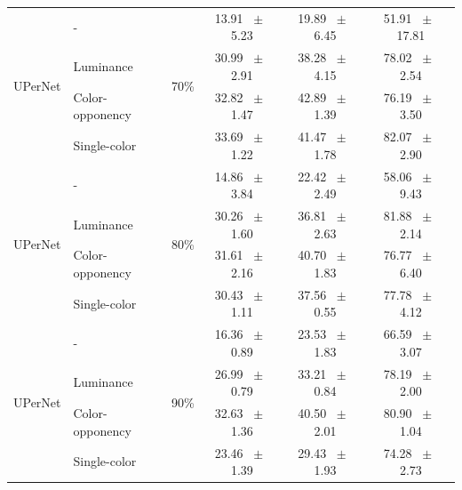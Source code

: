 \begin{table}[h]
\begin{tabular}{@{}l l c c c c@{}}
    \multirow{4}{*}{UPerNet} & - & \multirow{4}{*}{70\%} & 13.91 ~$\pm$~ 5.23 & 19.89 ~$\pm$~ 6.45 & 51.91 ~$\pm$~ 17.81 \\
    & Luminance &  & 30.99 ~$\pm$~ 2.91 & 38.28 ~$\pm$~ 4.15 & 78.02 ~$\pm$~ 2.54 \\
    & Color-opponency &  & 32.82 ~$\pm$~ 1.47 & 42.89 ~$\pm$~ 1.39 & 76.19 ~$\pm$~ 3.50 \\
    & Single-color &  & 33.69 ~$\pm$~ 1.22 & 41.47 ~$\pm$~ 1.78 & 82.07 ~$\pm$~ 2.90 \\
    \midrule
    \multirow{4}{*}{UPerNet} & - & \multirow{4}{*}{80\%} & 14.86 ~$\pm$~ 3.84 & 22.42 ~$\pm$~ 2.49 & 58.06 ~$\pm$~ 9.43 \\
    & Luminance &  & 30.26 ~$\pm$~ 1.60 & 36.81 ~$\pm$~ 2.63 & 81.88 ~$\pm$~ 2.14 \\
    & Color-opponency &  & 31.61 ~$\pm$~ 2.16 & 40.70 ~$\pm$~ 1.83 & 76.77 ~$\pm$~ 6.40 \\
    & Single-color &  & 30.43 ~$\pm$~ 1.11 & 37.56 ~$\pm$~ 0.55 & 77.78 ~$\pm$~ 4.12 \\
    \midrule
    \multirow{4}{*}{UPerNet} & - & \multirow{4}{*}{90\%} & 16.36 ~$\pm$~ 0.89 & 23.53 ~$\pm$~ 1.83 & 66.59 ~$\pm$~ 3.07 \\
    & Luminance &  & 26.99 ~$\pm$~ 0.79 & 33.21 ~$\pm$~ 0.84 & 78.19 ~$\pm$~ 2.00 \\
    & Color-opponency &  & 32.63 ~$\pm$~ 1.36 & 40.50 ~$\pm$~ 2.01 & 80.90 ~$\pm$~ 1.04 \\
    & Single-color &  & 23.46 ~$\pm$~ 1.39 & 29.43 ~$\pm$~ 1.93 & 74.28 ~$\pm$~ 2.73 \\
    \midrule
    \bottomrule
  \end{tabular}
  \label{tab:upernet_acdc_rain}
\end{table}